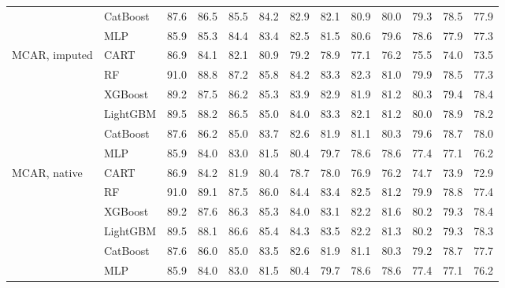 \documentclass[pdflatex,sn-mathphys]{sn-jnl}
\theoremstyle{thmstyleone}
\begin{document}
\begin{table}[htbp]
\begin{tabular}{@{}llrrrrrrrrrrr@{}}
 & CatBoost & 87.6 & 86.5 & 85.5 & 84.2 & 82.9 & 82.1 & 80.9 & 80.0 & 79.3 & 78.5 & 77.9 \\
 & MLP & 85.9 & 85.3 & 84.4 & 83.4 & 82.5 & 81.5 & 80.6 & 79.6 & 78.6 & 77.9 & 77.3 \\
\midrule
MCAR, imputed & CART & 86.9 & 84.1 & 82.1 & 80.9 & 79.2 & 78.9 & 77.1 & 76.2 & 75.5 & 74.0 & 73.5 \\
 & RF & 91.0 & 88.8 & 87.2 & 85.8 & 84.2 & 83.3 & 82.3 & 81.0 & 79.9 & 78.5 & 77.3 \\
 & XGBoost & 89.2 & 87.5 & 86.2 & 85.3 & 83.9 & 82.9 & 81.9 & 81.2 & 80.3 & 79.4 & 78.4 \\
 & LightGBM & 89.5 & 88.2 & 86.5 & 85.0 & 84.0 & 83.3 & 82.1 & 81.2 & 80.0 & 78.9 & 78.2 \\
 & CatBoost & 87.6 & 86.2 & 85.0 & 83.7 & 82.6 & 81.9 & 81.1 & 80.3 & 79.6 & 78.7 & 78.0 \\
 & MLP & 85.9 & 84.0 & 83.0 & 81.5 & 80.4 & 79.7 & 78.6 & 78.6 & 77.4 & 77.1 & 76.2 \\
\midrule
MCAR, native & CART & 86.9 & 84.2 & 81.9 & 80.4 & 78.7 & 78.0 & 76.9 & 76.2 & 74.7 & 73.9 & 72.9 \\
 & RF & 91.0 & 89.1 & 87.5 & 86.0 & 84.4 & 83.4 & 82.5 & 81.2 & 79.9 & 78.8 & 77.4 \\
 & XGBoost & 89.2 & 87.6 & 86.3 & 85.3 & 84.0 & 83.1 & 82.2 & 81.6 & 80.2 & 79.3 & 78.4 \\
 & LightGBM & 89.5 & 88.1 & 86.6 & 85.4 & 84.3 & 83.5 & 82.2 & 81.3 & 80.2 & 79.3 & 78.3 \\
 & CatBoost & 87.6 & 86.0 & 85.0 & 83.5 & 82.6 & 81.9 & 81.1 & 80.3 & 79.2 & 78.7 & 77.7 \\
 & MLP & 85.9 & 84.0 & 83.0 & 81.5 & 80.4 & 79.7 & 78.6 & 78.6 & 77.4 & 77.1 & 76.2 \\
\bottomrule
\end{tabular}
\end{table}
\end{document}
